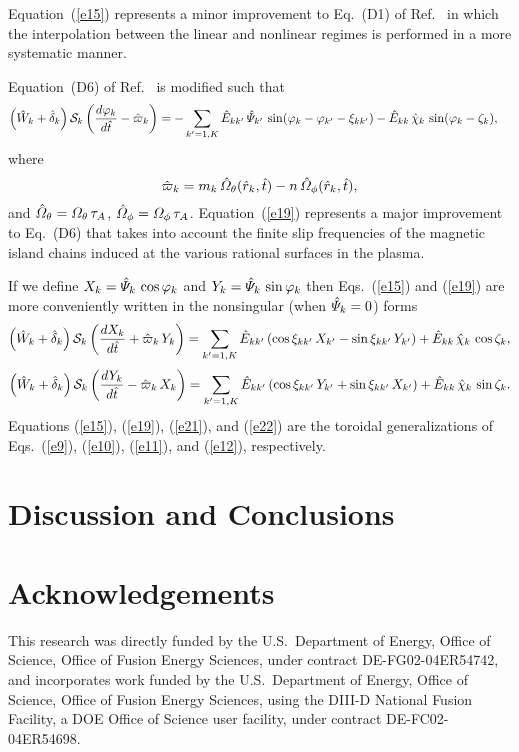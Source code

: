 \documentclass[12pt,prb,aps]{revtex4-1}
\begin{document}
Equation~(\ref{e15}) represents a minor improvement to Eq.~(D1) of Ref.~ in which the interpolation between the
linear and nonlinear regimes is performed in a more systematic manner. 

Equation~(D6) of Ref.~ is modified such that
\begin{align}\label{e19}
\left(\hat{W}_k +\hat{\delta}_k\right){\cal S}_k\left(\frac{d\varphi_k}{d\hat{t}}-\hat{\varpi}_k\right)&=
- \sum_{k'=1,K}\hat{E}_{kk'}\,\hat{\mit\Psi}_{k'}\,\sin(\varphi_k-\varphi_{k'}-\xi_{kk'})-\hat{E}_{kk}\,\hat{\chi}_k\,\sin(\varphi_k-\zeta_k),
\end{align}
where
\begin{equation}
\hat{\varpi}_k= m_k\,\hat{\mit\Omega}_\theta(\hat{r}_k,\hat{t})-n\,\hat{\mit\Omega}_\phi(\hat{r}_k,\hat{t}),
\end{equation}
and $\hat{\mit\Omega}_\theta= {\mit\Omega}_\theta\,\tau_A$, $\hat{\mit\Omega}_\phi= {\mit\Omega}_\phi\,\tau_A$. Equation~(\ref{e19}) represents
a major improvement to Eq.~(D6) that takes into  account the finite slip frequencies of the magnetic island chains induced at
the various rational surfaces in the plasma. 

If we define $X_k = \hat{\mit\Psi}_k\,\cos\varphi_k$ and $Y_k=\hat{\mit\Psi}_k\,\sin\varphi_k$ then Eqs.~(\ref{e15}) and (\ref{e19}) are
more conveniently written in the nonsingular (when $\hat{\mit\Psi}_k=0$) forms
\begin{align}\label{e21}
\left(\hat{W}_k +\hat{\delta}_k\right){\cal S}_k\left(\frac{dX_k}{d\hat{t}} 
+\hat{\varpi}_k\,Y_k\right)= \sum_{k'=1,K}\hat{E}_{kk'}\,(\cos\xi_{kk'}\,X_{k'}  -\sin\xi_{kk'}\,Y_{k'}) + \hat{E}_{kk}\,\hat{\chi}_k\,\cos\zeta_k,\\[0.5ex]
\left(\hat{W}_k +\hat{\delta}_k\right){\cal S}_k\left(\frac{dY_k}{d\hat{t}} -\hat{\varpi}_k\,X_k\right)
= \sum_{k'=1,K}\hat{E}_{kk'}\,(\cos\xi_{kk'}\,Y_{k'}
+\sin\xi_{kk'}\,X_{k'}) + \hat{E}_{kk}\,\hat{\chi}_k\,\sin\zeta_k.\label{e22}
\end{align}
Equations (\ref{e15}), (\ref{e19}), (\ref{e21}), and (\ref{e22}) are the toroidal generalizations of Eqs.~(\ref{e9}), (\ref{e10}), (\ref{e11}), and (\ref{e12}), respectively.

\section{Discussion and Conclusions}

\section*{Acknowledgements}
This research was directly funded by the U.S.\ Department of Energy, Office of Science, Office of Fusion Energy Sciences,  under contract DE-FG02-04ER54742, and
incorporates work funded by the U.S.\ Department of Energy, Office of Science, Office of Fusion Energy Sciences, using the DIII-D National Fusion Facility, a DOE Office of Science user facility, under contract DE-FC02-04ER54698.  
\end{document}
